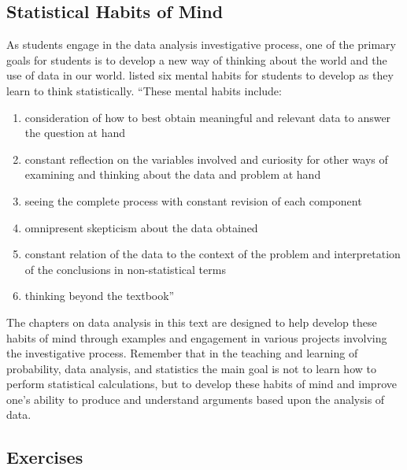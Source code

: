\documentclass[
]{book}
\providecommand{\tightlist}{%
  \setlength{\itemsep}{0pt}\setlength{\parskip}{0pt}}
\theoremstyle{definition}
\theoremstyle{definition}
\theoremstyle{definition}
\theoremstyle{definition}
\theoremstyle{remark}
\begin{document}
\hypertarget{statistical-habits-of-mind}{%
\subsection{Statistical Habits of Mind}\label{statistical-habits-of-mind}}

As students engage in the data analysis investigative process, one of the primary goals for students is to develop a new way of thinking about the world and the use of data in our world. \citet{Chance2002} listed six mental habits for students to develop as they learn to think statistically. ``These mental habits include:

\begin{enumerate}
\def\labelenumi{\arabic{enumi}.}
\tightlist
\item
  consideration of how to best obtain meaningful and relevant data to answer the question at hand
\item
  constant reflection on the variables involved and curiosity for other ways of examining and thinking about the data and problem at hand
\item
  seeing the complete process with constant revision of each component
\item
  omnipresent skepticism about the data obtained
\item
  constant relation of the data to the context of the problem and interpretation of the conclusions in non-statistical terms
\item
  thinking beyond the textbook''
\end{enumerate}

The chapters on data analysis in this text are designed to help develop these habits of mind through examples and engagement in various projects involving the investigative process. Remember that in the teaching and learning of probability, data analysis, and statistics the main goal is not to learn how to perform statistical calculations, but to develop these habits of mind and improve one's ability to produce and understand arguments based upon the analysis of data.

\hypertarget{exercises-60}{%
\subsection{Exercises}\label{exercises-60}}
\end{document}
